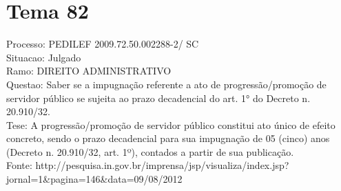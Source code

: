 \documentclass[12pt]{article}
\begin{document}
\section*{Tema 82}
Processo: PEDILEF 2009.72.50.002288-2/ SC\\
Situacao: Julgado\\
Ramo: DIREITO ADMINISTRATIVO\\
Questao: Saber se a impugnação referente a ato de progressão/promoção de servidor público se sujeita ao prazo decadencial do art. 1° do Decreto n. 20.910/32.\\
Tese: A progressão/promoção de servidor público constitui ato único de efeito concreto, sendo o prazo decadencial para sua impugnação de 05 (cinco) anos (Decreto n. 20.910/32, art. 1º), contados a partir de sua publicação.\\
Fonte: http://pesquisa.in.gov.br/imprensa/jsp/visualiza/index.jsp?jornal=1\&pagina=146\&data=09/08/2012
\end{document}
